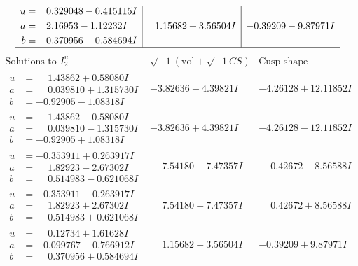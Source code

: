 \documentclass[1p]{elsarticle_modified}
\theoremstyle{definition}
\newcommand{\I}{\sqrt{-1}}
\begin{document}
$$\begin{array}{c|c|c}
\begin{aligned}
u &= \phantom{-}0.329048 - 0.415115 I \\
a &= \phantom{-}2.16953 - 1.12232 I \\
b &= \phantom{-}0.370956 - 0.584694 I\end{aligned}
 & \phantom{-}1.15682 + 3.56504 I & -0.39209 - 9.87971 I\\
 \hline 
 \end{array}$$\newpage$$\begin{array}{c|c|c}  
\text{Solutions to }I^u_{2}& \I (\text{vol} + \sqrt{-1}CS) & \text{Cusp shape}\\
 \hline 
\begin{aligned}
u &= \phantom{-}1.43862 + 0.58080 I \\
a &= \phantom{-}0.039810 + 1.315730 I \\
b &= -0.92905 - 1.08318 I\end{aligned}
 & -3.82636 - 4.39821 I & -4.26128 + 12.11852 I \\ \hline\begin{aligned}
u &= \phantom{-}1.43862 - 0.58080 I \\
a &= \phantom{-}0.039810 - 1.315730 I \\
b &= -0.92905 + 1.08318 I\end{aligned}
 & -3.82636 + 4.39821 I & -4.26128 - 12.11852 I \\ \hline\begin{aligned}
u &= -0.353911 + 0.263917 I \\
a &= \phantom{-}1.82923 - 2.67302 I \\
b &= \phantom{-}0.514983 - 0.621068 I\end{aligned}
 & \phantom{-}7.54180 + 7.47357 I & \phantom{-}0.42672 - 8.56588 I \\ \hline\begin{aligned}
u &= -0.353911 - 0.263917 I \\
a &= \phantom{-}1.82923 + 2.67302 I \\
b &= \phantom{-}0.514983 + 0.621068 I\end{aligned}
 & \phantom{-}7.54180 - 7.47357 I & \phantom{-}0.42672 + 8.56588 I \\ \hline\begin{aligned}
u &= \phantom{-}0.12734 + 1.61628 I \\
a &= -0.099767 - 0.766912 I \\
b &= \phantom{-}0.370956 + 0.584694 I\end{aligned}
 & \phantom{-}1.15682 - 3.56504 I & -0.39209 + 9.87971 I \\ \hline\begin{aligned}

\end{aligned}
\end{array}$$
\end{document}
